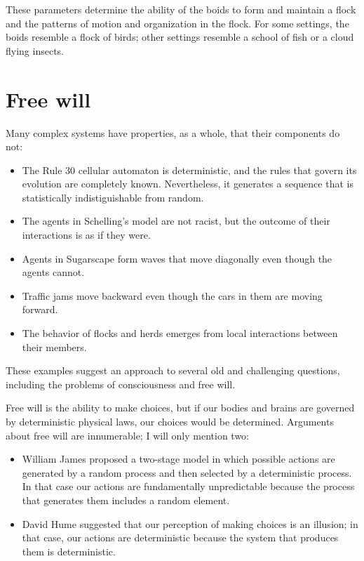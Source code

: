 \documentclass[12pt]{book}
\theoremstyle{exercise}
\begin{document}
These parameters determine the ability of the boids to form and
maintain a flock and the patterns of motion and organization in the
flock.  For some settings, the boids resemble a flock of birds; other
settings resemble a school of fish or a cloud flying insects.


\section{Free will}
\label{freewill}




Many complex systems have properties, as a whole, that their
components do not:

\begin{itemize}

\item The Rule 30 cellular automaton is deterministic, and the rules
  that govern its evolution are completely known.  Nevertheless, it
  generates a sequence that is statistically indistiguishable from
  random.

\item The agents in Schelling's model are not racist, but the outcome
  of their interactions is as if they were.

\item Agents in Sugarscape form waves that move diagonally even
though the agents cannot.

\item Traffic jams move backward even though the cars in them are
  moving forward.

\item The behavior of flocks and herds emerges from local interactions
  between their members.

\end{itemize}

These examples suggest an approach to several old and challenging
questions, including the problems of consciousness and free will.

Free will is the ability to make choices, but if our bodies and brains
are governed by deterministic physical laws, our choices would be
determined.  Arguments about free will are innumerable; I will
only mention two:

\begin{itemize}

\item William James proposed a two-stage model in which
  possible actions are generated by a random process and then selected
  by a deterministic process.  In that case our actions are
  fundamentally unpredictable because the process that generates them
  includes a random element.

\item David Hume suggested that our perception of making choices
  is an illusion; in that case, our actions are deterministic because
  the system that produces them is deterministic.

\end{itemize}
\end{document}
